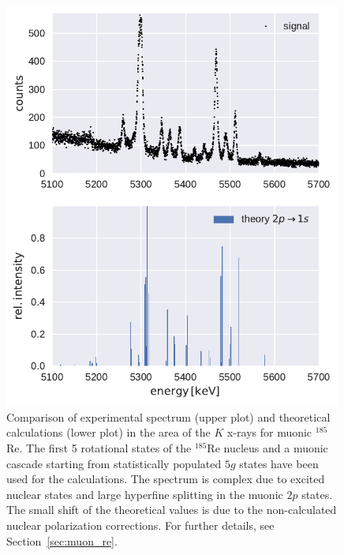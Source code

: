 \begin{figure}%
\centering
\includegraphics[width=0.99\textwidth]{pics/comparison_21}
\caption{
Comparison of experimental spectrum (upper plot) and theoretical calculations (lower plot) in the area of the $K$ x-rays for muonic $^{185}$Re. The first 5 rotational states of the $^{185}$Re nucleus and a muonic cascade starting from statistically populated $5g$ states have been used for the calculations. The spectrum is complex due to excited nuclear states and large hyperfine splitting in the muonic $2p$ states. The small shift of the theoretical values is due to the non-calculated nuclear polarization corrections. For further details, see Section~\ref{sec:muon_re}.
}
\label{fig:re54_K}
\end{figure}
%
%
%
\clearpage
